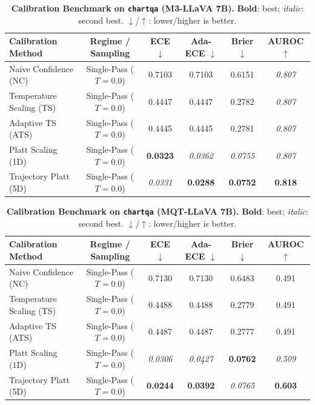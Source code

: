 \begin{table}[t]
\setlength{\tabcolsep}{4pt}
\renewcommand{\arraystretch}{1.05}
\centering
\footnotesize
\begin{tabular}{lccccc}
\toprule
\textbf{Calibration Method} & \textbf{Regime / Sampling} & \textbf{ECE} $\downarrow$ & \textbf{Ada-ECE} $\downarrow$ & \textbf{Brier} $\downarrow$ & \textbf{AUROC} $\uparrow$ \\
\midrule
Naive Confidence (NC) & Single-Pass ($T = 0.0$) & 0.7103 & 0.7103 & 0.6151 & \textit{0.807} \\
Temperature Scaling (TS) & Single-Pass ($T = 0.0$) & 0.4447 & 0.4447 & 0.2782 & \textit{0.807} \\
Adaptive TS (ATS) & Single-Pass ($T = 0.0$) & 0.4445 & 0.4445 & 0.2781 & \textit{0.807} \\
Platt Scaling (1D) & Single-Pass ($T = 0.0$) & \textbf{0.0323} & \textit{0.0362} & \textit{0.0755} & \textit{0.807} \\
Trajectory Platt (5D) & Single-Pass ($T = 0.0$) & \textit{0.0331} & \textbf{0.0288} & \textbf{0.0752} & \textbf{0.818} \\
\bottomrule
\end{tabular}
\caption{\textbf{Calibration Benchmark on \texttt{chartqa} (M3-LLaVA 7B).} \textbf{Bold}: best; \textit{italic}: second best. $\downarrow$/$\uparrow$: lower/higher is better.}
\label{tab:benchmark_m3_chartqa}
\end{table}

\begin{table}[t]
\setlength{\tabcolsep}{4pt}
\renewcommand{\arraystretch}{1.05}
\centering
\footnotesize
\begin{tabular}{lccccc}
\toprule
\textbf{Calibration Method} & \textbf{Regime / Sampling} & \textbf{ECE} $\downarrow$ & \textbf{Ada-ECE} $\downarrow$ & \textbf{Brier} $\downarrow$ & \textbf{AUROC} $\uparrow$ \\
\midrule
Naive Confidence (NC) & Single-Pass ($T = 0.0$) & 0.7130 & 0.7130 & 0.6483 & 0.491 \\
Temperature Scaling (TS) & Single-Pass ($T = 0.0$) & 0.4488 & 0.4488 & 0.2779 & 0.491 \\
Adaptive TS (ATS) & Single-Pass ($T = 0.0$) & 0.4487 & 0.4487 & 0.2777 & 0.491 \\
Platt Scaling (1D) & Single-Pass ($T = 0.0$) & \textit{0.0306} & \textit{0.0427} & \textbf{0.0762} & \textit{0.509} \\
Trajectory Platt (5D) & Single-Pass ($T = 0.0$) & \textbf{0.0244} & \textbf{0.0392} & \textit{0.0765} & \textbf{0.603} \\
\bottomrule
\end{tabular}
\caption{\textbf{Calibration Benchmark on \texttt{chartqa} (MQT-LLaVA 7B).} \textbf{Bold}: best; \textit{italic}: second best. $\downarrow$/$\uparrow$: lower/higher is better.}
\label{tab:benchmark_mqt_chartqa}
\end{table}
